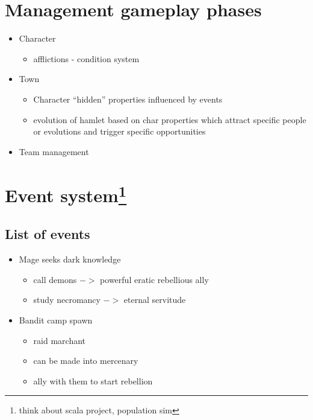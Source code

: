 \documentclass{report}
\begin{document}
	\section{Management gameplay phases}

	\begin{itemize}
		\item Character
		\begin{itemize}
			\item afflictions - condition system
		\end{itemize}
		\item Town
			\begin{itemize}
				\item Character ``hidden'' properties influenced by events
				\item evolution of hamlet based on char properties which attract specific people or evolutions and trigger specific opportunities
			\end{itemize}
		\item Team management
	\end{itemize}

	\section[Event system]{Event system\footnote{think about scala project, population sim}}

		\subsection*{List of events}
		\begin{itemize}
			\item Mage seeks dark knowledge
			\begin{itemize}
				\item call demons $->$ powerful eratic rebellious ally
				\item study necromancy $->$ eternal servitude
			\end{itemize}

			\item Bandit camp spawn
			\begin{itemize}
				\item raid marchant
				\item can be made into mercenary
				\item ally with them to start rebellion
			\end{itemize}

		\end{itemize}
\end{document}
